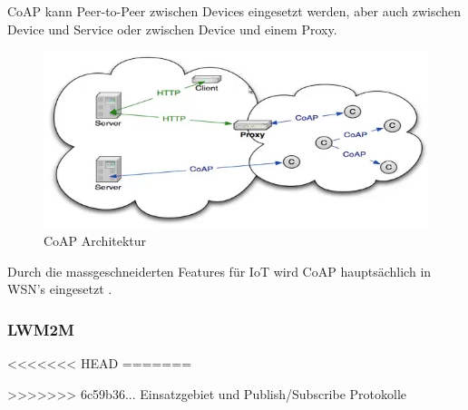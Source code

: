 CoAP kann Peer-to-Peer zwischen Devices eingesetzt werden, aber auch zwischen Device und Service oder zwischen Device und einem Proxy.
\begin{figure}[H]
\centering
\includegraphics[scale=0.8]{images/coap_architecture.png}
\caption{CoAP Architektur \cite{Shelby14}}
\end{figure}

Durch die massgeschneiderten Features für IoT wird CoAP hauptsächlich in WSN's eingesetzt \citep{Obermaier15}. 

\subsubsection{LWM2M}

<<<<<<< HEAD
=======




>>>>>>> 6c59b36... Einsatzgebiet und Publish/Subscribe Protokolle
